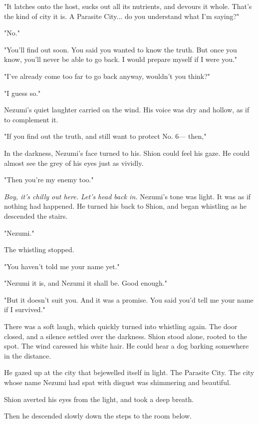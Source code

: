 "It latches onto the host, sucks out all its nutrients, and devours it
whole. That's the kind of city it is. A Parasite City... do you
understand what I'm saying?"

"No."

"You'll find out soon. You said you wanted to know the truth. But once
you know, you'll never be able to go back. I would prepare myself if I
were you."

"I've already come too far to go back anyway, wouldn't you think?"

"I guess so."

Nezumi's quiet laughter carried on the wind. His voice was dry and
hollow, as if to complement it.

"If you find out the truth, and still want to protect No. 6--- then,"

In the darkness, Nezumi's face turned to his. Shion could feel his gaze.
He could almost see the grey of his eyes just as vividly.~

"Then you're my enemy too."

\emph{Boy, it's chilly out here. Let's head back in.} Nezumi's tone was light.
It was as if nothing had happened. He turned his back to Shion, and
began whistling as he descended the stairs.

"Nezumi."

The whistling stopped.

"You haven't told me your name yet."

"Nezumi it is, and Nezumi it shall be. Good enough."

"But it doesn't suit you. And it was a promise. You said you'd tell me
your name if I survived."

There was a soft laugh, which quickly turned into whistling again. The
door closed, and a silence settled over the darkness. Shion stood alone,
rooted to the spot. The wind caressed his white hair. He could hear a
dog barking somewhere in the distance.

He gazed up at the city that bejewelled itself in light. The Parasite
City. The city whose name Nezumi had spat with disgust was shimmering
and beautiful.

Shion averted his eyes from the light, and took a deep breath.

Then he descended slowly down the steps to the room below.